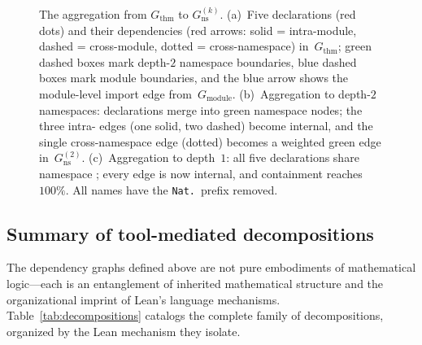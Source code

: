 \begin{figure}[ht]
\caption{The aggregation from $G_{\mathrm{thm}}$ to $G_{\mathrm{ns}}^{(k)}$. (a)~Five declarations (\textcolor{red!70!black}{red dots}) and their dependencies (\textcolor{red!70!black}{red arrows}: solid = intra-module, dashed = cross-module, dotted = cross-namespace) in~$G_{\mathrm{thm}}$; \textcolor{green!40!black}{green dashed boxes} mark depth-$2$ namespace boundaries, \textcolor{blue!60!black}{blue dashed boxes} mark module boundaries, and the \textcolor{blue!60!black}{blue arrow} shows the module-level import edge from~$G_{\mathrm{module}}$. (b)~Aggregation to depth-$2$ namespaces: declarations merge into \textcolor{green!50!black}{green namespace nodes}; the three intra- edges (one solid, two dashed) become internal, and the single cross-namespace edge (dotted) becomes a weighted \textcolor{green!50!black}{green edge} in~$G_{\mathrm{ns}}^{(2)}$. (c)~Aggregation to depth~$1$: all five declarations share namespace ; every edge is now internal, and containment reaches $100\%$. All names have the \texttt{Nat.}\ prefix removed.}
\label{fig:ns-aggregation-app}
\end{figure}

\subsection{Summary of tool-mediated decompositions}
\label{sec:decomposition-summary}

The dependency graphs defined above are not pure embodiments of mathematical logic---each is an entanglement of inherited mathematical structure and the organizational imprint of Lean's language mechanisms. Table~\ref{tab:decompositions} catalogs the complete family of decompositions, organized by the Lean mechanism they isolate.

